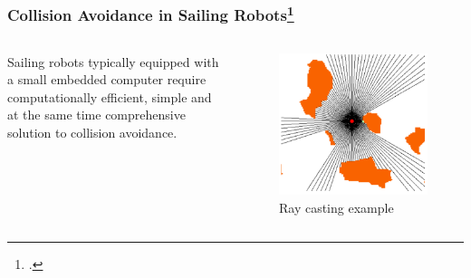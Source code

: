 \documentclass[
    11pt, %
    aspectratio=169, %
]{beamer}
\begin{document}
\begin{frame}
    \frametitle{Collision Avoidance in Sailing Robots\footcite{sauzeRaycastApproachCollision2010}}

    \begin{columns}[c]
        \begin{column}{0.5\textwidth}
            Sailing robots typically equipped with a small embedded computer require computationally efficient, simple
            and at the same time comprehensive solution to collision avoidance.
        \end{column}
        \begin{column}{0.5\textwidth}
            \begin{center}
                \begin{figure}
                    \caption{Ray casting example}
                    \includegraphics[scale=0.25]{assets/casr-raycast-example.png}
                \end{figure}
            \end{center}
        \end{column}
    \end{columns}
\end{frame}
\end{document}
